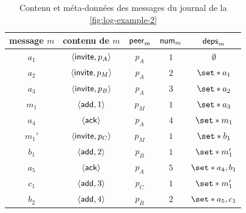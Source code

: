 \begin{table}[hbt]
    \centering
    \begin{tabular}{ccccc}
        message $m$ & contenu de $m$ & $\trm{peer}_m$ & $\trm{num}_m$ & $\trm{deps}_m$ \\
        \toprule
        $a_1$ & $\tuple*{\trm{invite}, p_A}$ & $p_A$ & $1$ & $\emptyset$ \\
        $a_2$ & $\tuple*{\trm{invite}, p_M}$ & $p_A$ & $2$ & $\set*{a_1}$ \\
        $a_3$ & $\tuple*{\trm{invite}, p_B}$ & $p_A$ & $3$ & $\set*{a_2}$ \\
        $m_1$ & $\tuple*{\trm{add}, 1}$ & $p_M$ & $1$ & $\set*{a_3}$ \\
        $a_4$ & $\tuple*{\trm{ack}}$ & $p_A$ & $4$ & $\set*{m_1}$ \\
        $m_1'$ & $\tuple*{\trm{invite}, p_C}$ & $p_M$ & $1$ & $\set*{b_1}$ \\
        $b_1$ & $\tuple*{\trm{add}, 2}$ & $p_B$ & $1$ & $\set*{m_1'}$ \\
        $a_5$ & $\tuple*{\trm{ack}}$ & $p_A$ & $5$ & $\set*{a_4,b_1}$ \\
        $c_1$ & $\tuple*{\trm{add}, 3}$ & $p_C$ & $1$ & $\set*{m_1'}$ \\
        $b_2$ & $\tuple*{\trm{add}, 4}$ & $p_B$ & $2$ & $\set*{a_5,c_1}$ \\
    \end{tabular}
    \caption{Contenu et méta-données des messages du journal de la \autoref{fig:log-example-2}}\label{tab:msg-metadata-protocol-exec}
\end{table}

